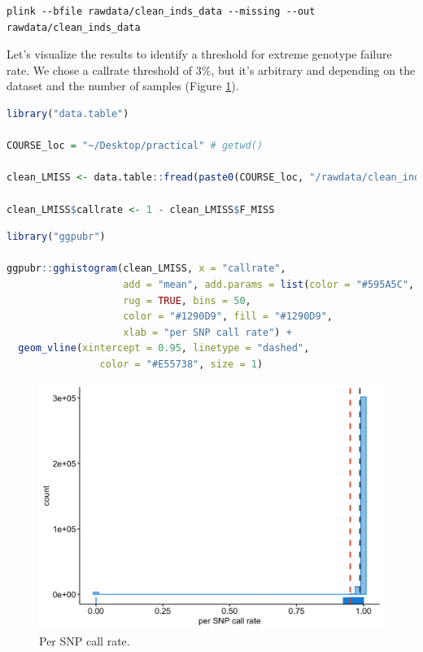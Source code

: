 \documentclass[
]{book}
\begin{document}
\begin{lstlisting}
plink --bfile rawdata/clean_inds_data --missing --out rawdata/clean_inds_data
\end{lstlisting}

Let's visualize the results to identify a threshold for extreme genotype failure rate. We chose a callrate threshold of 3\%, but it's arbitrary and depending on the dataset and the number of samples (Figure \ref{fig:show-snp-callrate}).

\begin{lstlisting}[language=R]
library("data.table")

COURSE_loc = "~/Desktop/practical" # getwd()

clean_LMISS <- data.table::fread(paste0(COURSE_loc, "/rawdata/clean_inds_data.lmiss"))

clean_LMISS$callrate <- 1 - clean_LMISS$F_MISS
\end{lstlisting}

\begin{lstlisting}[language=R]
library("ggpubr")

ggpubr::gghistogram(clean_LMISS, x = "callrate",
                    add = "mean", add.params = list(color = "#595A5C", linetype = "dashed", size = 1),
                    rug = TRUE, bins = 50,
                    color = "#1290D9", fill = "#1290D9",
                    xlab = "per SNP call rate") +
  geom_vline(xintercept = 0.95, linetype = "dashed",
                color = "#E55738", size = 1)
\end{lstlisting}

\begin{figure}

{\centering \includegraphics[width=18.67in]{img/show-snp-callrate} 

}

\caption{Per SNP call rate.}\label{fig:show-snp-callrate}
\end{figure}
\end{document}

